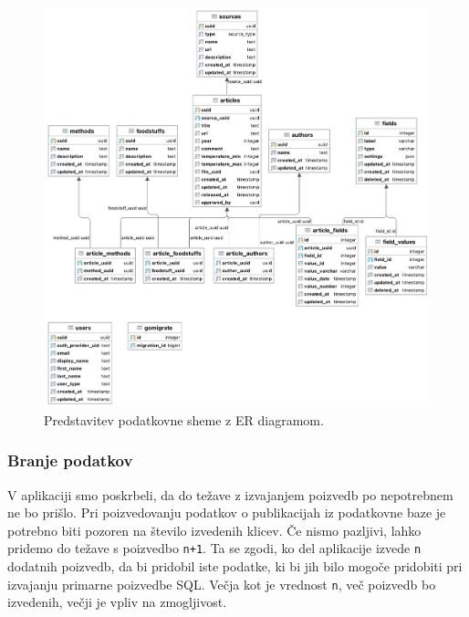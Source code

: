 \documentclass[a4paper, 12pt]{book}
\begin{document}
\begin{figure}[ht]
\begin{center}
\includegraphics[width=1\textwidth]{slike/database-structure.png}
\end{center}
\caption{ Predstavitev podatkovne sheme z ER diagramom. }
\label{database-diagram-er}
\end{figure}

\subsubsection{Branje podatkov}
V aplikaciji smo poskrbeli, da do težave z izvajanjem poizvedb po nepotrebnem ne bo prišlo. Pri poizvedovanju podatkov o publikacijah iz podatkovne baze je potrebno biti pozoren na število izvedenih klicev. Če nismo pazljivi, lahko pridemo do težave s poizvedbo \verb=n+1=. Ta se zgodi, ko del aplikacije izvede \verb=n= dodatnih poizvedb, da bi pridobil iste podatke, ki bi jih bilo mogoče pridobiti pri izvajanju primarne poizvedbe SQL. Večja kot je vrednost \verb=n=, več poizvedb bo izvedenih, večji je vpliv na zmogljivost.

\clearpage
\end{document}

